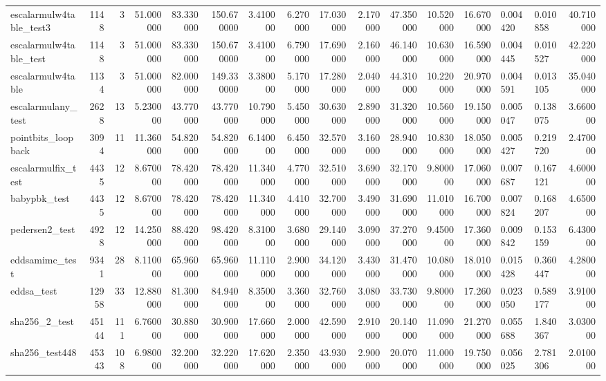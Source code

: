 \begin{tabular}{lrrrrrrrrrrrrllr}
escalarmulw4table\_test3 & 1148 & 3 & 51.000000 & 83.330000 & 150.670000 & 3.410000 & 6.270000 & 17.030000 & 2.170000 & 47.350000 & 10.520000 & 16.670000 & 0.004420 & 0.010858 & 40.710000 \\
escalarmulw4table\_test & 1148 & 3 & 51.000000 & 83.330000 & 150.670000 & 3.410000 & 6.790000 & 17.690000 & 2.160000 & 46.140000 & 10.630000 & 16.590000 & 0.004445 & 0.010527 & 42.220000 \\
escalarmulw4table & 1134 & 3 & 51.000000 & 82.000000 & 149.330000 & 3.380000 & 5.170000 & 17.280000 & 2.040000 & 44.310000 & 10.220000 & 20.970000 & 0.004591 & 0.013105 & 35.040000 \\
escalarmulany\_test & 2628 & 13 & 5.230000 & 43.770000 & 43.770000 & 10.790000 & 5.450000 & 30.630000 & 2.890000 & 31.320000 & 10.560000 & 19.150000 & 0.005047 & 0.138075 & 3.660000 \\
pointbits\_loopback & 3094 & 11 & 11.360000 & 54.820000 & 54.820000 & 6.140000 & 6.450000 & 32.570000 & 3.160000 & 28.940000 & 10.830000 & 18.050000 & 0.005427 & 0.219720 & 2.470000 \\
escalarmulfix\_test & 4435 & 12 & 8.670000 & 78.420000 & 78.420000 & 11.340000 & 4.770000 & 32.510000 & 3.690000 & 32.170000 & 9.800000 & 17.060000 & 0.007687 & 0.167121 & 4.600000 \\
babypbk\_test & 4435 & 12 & 8.670000 & 78.420000 & 78.420000 & 11.340000 & 4.410000 & 32.700000 & 3.490000 & 31.690000 & 11.010000 & 16.700000 & 0.007824 & 0.168207 & 4.650000 \\
pedersen2\_test & 4928 & 12 & 14.250000 & 88.420000 & 98.420000 & 8.310000 & 3.680000 & 29.140000 & 3.090000 & 37.270000 & 9.450000 & 17.360000 & 0.009842 & 0.153159 & 6.430000 \\
eddsamimc\_test & 9341 & 28 & 8.110000 & 65.960000 & 65.960000 & 11.110000 & 2.900000 & 34.120000 & 3.430000 & 31.470000 & 10.080000 & 18.010000 & 0.015428 & 0.360447 & 4.280000 \\
eddsa\_test & 12958 & 33 & 12.880000 & 81.300000 & 84.940000 & 8.350000 & 3.360000 & 32.760000 & 3.080000 & 33.730000 & 9.800000 & 17.260000 & 0.023050 & 0.589177 & 3.910000 \\
sha256\_2\_test & 45144 & 111 & 6.760000 & 30.880000 & 30.900000 & 17.660000 & 2.000000 & 42.590000 & 2.910000 & 20.140000 & 11.090000 & 21.270000 & 0.055688 & 1.840367 & 3.030000 \\
sha256\_test448 & 45343 & 108 & 6.980000 & 32.200000 & 32.220000 & 17.620000 & 2.350000 & 43.930000 & 2.900000 & 20.070000 & 11.000000 & 19.750000 & 0.056025 & 2.781306 & 2.010000 \\

\end{tabular}
